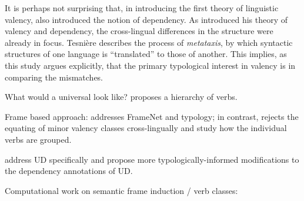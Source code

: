 It is perhaps not surprising that, in introducing the first theory of linguistic valency, \citet{tesniere1959} also introduced the notion of dependency. As \citet{tesniere1959} introduced his theory of valency and dependency, the cross-lingual differences in the structure were already in focus. Tesnière describes the process of \textit{metataxis}, by which syntactic structures of one language is ``translated'' to those of another. This implies, as this study argues explicitly, that the primary typological interest in valency is in comparing the mismatches. 



What would a universal look like? \citet{tsunoda1981, tsunoda1985, tsunoda2015} proposes a hierarchy of verbs.

Frame based approach: \citet{baker2020, ellsworth2021} addresses FrameNet and typology; in contrast, \citet{say2014} rejects the equating of minor valency classes cross-lingually and study how the individual verbs are grouped.






\citet{croft2017} address UD specifically and propose more typologically-informed modifications to the dependency annotations of UD. 

Computational work on semantic frame induction / verb classes:  \citet{abend2009, basili1993, bickel2014, dowty1991, fellbaum1998, fillmore1968, furstenau2012, kipper-schuler2005, kipper2008, korhonen2006, levin2015, majewska2018, majewska2020, majewska2021, miller1990, miller1995, navarretta2000, palmer2005, say2014, sayeed2018, schulteimwalde2002, schulteimwalde2003, schulteimwalde2006, snider2006, sun2008, sun2009, sun2013, titov2012, watanabe2010, yamada2021} 





